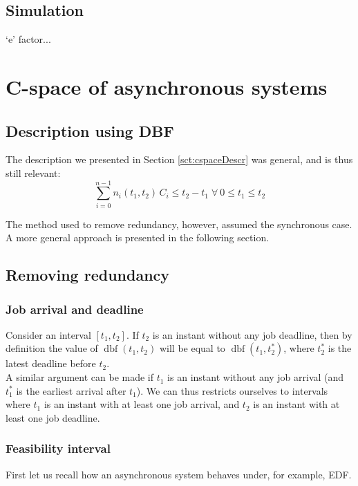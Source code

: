 \documentclass[times, 10pt,twocolumn, a4paper]{article}
\newcommand{\dbf}[1]{\operatorname{dbf}(#1)}
\begin{document}
  \subsection{Simulation}

  `e' factor...

\section{C-space of asynchronous systems}
  \label{sct:asyncCspace}

  \subsection{Description using DBF}

  The description we presented in Section \ref{sct:cspaceDescr} was general, and is thus still relevant: $$\sum_{i=0}^{n-1} n_i(t_1, t_2) \, C_i \leq t_2 - t_1 \; \forall \: 0 \leq t_1 \leq t_2$$

  The method used to remove redundancy, however, assumed the synchronous case. A more general approach is presented in the following section.

  \subsection{Removing redundancy}

\subsubsection{Job arrival and deadline}

Consider an interval $[t_1, t_2]$. If $t_2$ is an instant without any job deadline, then by definition the value of $\dbf{t_1, t_2}$ will be equal to $\dbf{t_1, t_2^*}$, where $t_2^*$ is the latest deadline before $t_2$.\\

A similar argument can be made if $t_1$ is an instant without any job arrival (and $t_1^*$ is the earliest arrival after $t_1$). We can thus restricts ourselves to intervals where $t_1$ is an instant with at least one job arrival, and $t_2$ is an instant with at least one job deadline.

  \subsubsection{Feasibility interval}

  First let us recall how an asynchronous system behaves under, for example, EDF.\\
\end{document}
